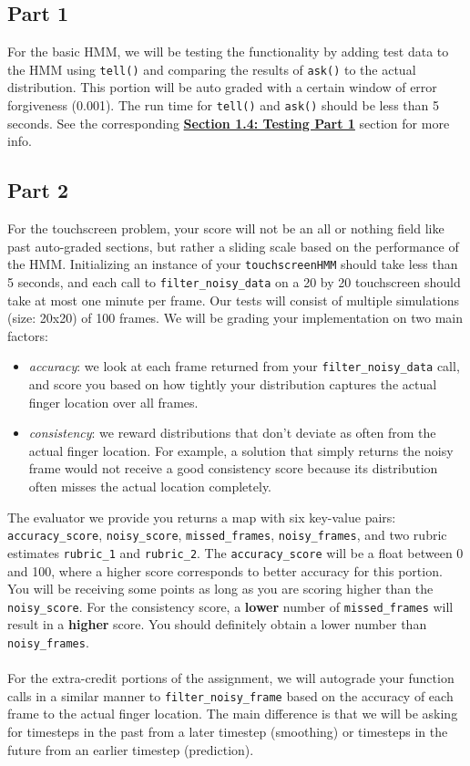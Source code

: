 \documentclass{article}
\begin{document}
    \subsection{Part 1}
    For the basic HMM, we will be testing the functionality by adding test data to the HMM using \texttt{tell()} and comparing the results of \texttt{ask()} to the actual distribution. This portion will be auto graded with a certain window of error forgiveness (0.001). The run time for \texttt{tell()} and \texttt{ask()} should be less than 5 seconds. See the corresponding \hyperref[subsec:testingpart1]{\textbf{Section 1.4: Testing Part 1}} section for more info.
    \subsection{Part 2}
    \label{subsec:part2grading}
        For the touchscreen problem, your score will not be an all or nothing field like past auto-graded sections, but rather a sliding scale based on the performance of the HMM. Initializing an instance of your \texttt{touchscreenHMM} should take less than 5 seconds, and each call to \texttt{filter\_noisy\_data} on a 20 by 20 touchscreen should take at most one minute per frame. Our tests will consist of multiple simulations (size: 20x20) of 100 frames. We will be grading your implementation on two main factors:
        \begin{itemize}
        \item \textit{accuracy}: we look at each frame returned from your \texttt{filter\_noisy\_data} call, and score you based on how tightly your distribution captures the actual finger location over all frames.
        \item \textit{consistency}: we reward distributions that don't deviate as often from the actual finger location. For example, a solution that simply returns the noisy frame would not receive a good consistency score because its distribution often misses the actual location completely.
        \end{itemize}
        The evaluator we provide you returns a map with six key-value pairs: \texttt{accuracy\_score}, \texttt{noisy\_score}, \texttt{missed\_frames}, \texttt{noisy\_frames}, and two rubric estimates \texttt{rubric\_1} and \texttt{rubric\_2}. The \texttt{accuracy\_score} will be a float between 0 and 100, where a higher score corresponds to better accuracy for this portion. You will be receiving some points as long as you are scoring higher than the \texttt{noisy\_score}. For the consistency score, a \textbf{lower} number of \texttt{missed\_frames} will result in a \textbf{higher} score. You should definitely obtain a lower number than \texttt{noisy\_frames}. \\\\
        For the extra-credit portions of the assignment, we will autograde your function calls in a similar manner to \texttt{filter\_noisy\_frame} based on the accuracy of each frame to the actual finger location. The main difference is that we will be asking for timesteps in the past from a later timestep (smoothing) or timesteps in the future from an earlier timestep (prediction).
\end{document}
